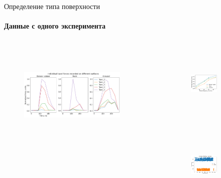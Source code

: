 \documentclass[aspectratio=169,xcolor=table]{beamer}
\begin{document}
\begin{frame}[t]{Определение типа поверхности}
    \framesubtitle{Данные с одного эксперимента}
    \begin{columns}[T,onlytextwidth]
        \begin{column}{0.60\textwidth}
            \begin{figure}[H]
                \centering\includegraphics[height=5cm,width=1\textwidth,keepaspectratio]{s_shape_leg/TaxelIndForce.png}
            \end{figure}
        \end{column}
        \begin{column}{0.35\textwidth}
            \vspace{-1.6cm}
            \begin{figure}[H]
                \begin{subfigure}{0.99\textwidth}
                    \centering\includegraphics[height=3.8cm,width=1\textwidth,keepaspectratio]{s_shape_leg/avg_lin_vel_rev_min.png} 
                \end{subfigure}

                \begin{subfigure}{0.99\textwidth}
                    \centering\includegraphics[height=3.8cm,width=1\textwidth,keepaspectratio]{s_shape_leg/segment6_compare_front.png}
                \end{subfigure}
                

            \end{figure}
        \end{column}
    \end{columns}
\end{frame}
\end{document}
